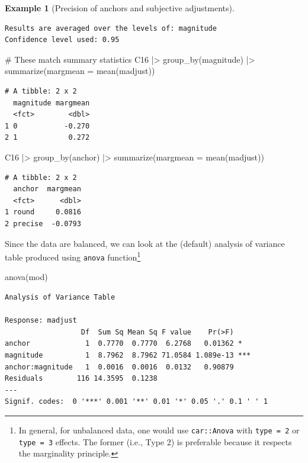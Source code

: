 \documentclass[
  11pt,
  letterpaper,
]{scrbook}
\newenvironment{Shaded}{\begin{snugshade}}{\end{snugshade}}
\newcommand{\AttributeTok}[1]{\textcolor[rgb]{0.40,0.45,0.13}{#1}}
\newcommand{\CommentTok}[1]{\textcolor[rgb]{0.37,0.37,0.37}{#1}}
\newcommand{\FunctionTok}[1]{\textcolor[rgb]{0.28,0.35,0.67}{#1}}
\newcommand{\NormalTok}[1]{\textcolor[rgb]{0.00,0.23,0.31}{#1}}
\newcommand{\SpecialCharTok}[1]{\textcolor[rgb]{0.37,0.37,0.37}{#1}}
\theoremstyle{definition}
\theoremstyle{definition}
\newtheorem{example}{Example}[chapter]
\theoremstyle{remark}
\begin{document}
\begin{example}[Precision of anchors and subjective
adjustments]
\begin{verbatim}
Results are averaged over the levels of: magnitude 
Confidence level used: 0.95 
\end{verbatim}

\begin{Shaded}
\begin{Highlighting}[]
\CommentTok{\# These match summary statistics}
\NormalTok{C16 }\SpecialCharTok{|\textgreater{}}
  \FunctionTok{group\_by}\NormalTok{(magnitude) }\SpecialCharTok{|\textgreater{}}
  \FunctionTok{summarize}\NormalTok{(}\AttributeTok{margmean =} \FunctionTok{mean}\NormalTok{(madjust))}
\end{Highlighting}
\end{Shaded}

\begin{verbatim}
# A tibble: 2 x 2
  magnitude margmean
  <fct>        <dbl>
1 0           -0.270
2 1            0.272
\end{verbatim}

\begin{Shaded}
\begin{Highlighting}[]
\NormalTok{C16 }\SpecialCharTok{|\textgreater{}}
  \FunctionTok{group\_by}\NormalTok{(anchor) }\SpecialCharTok{|\textgreater{}}
  \FunctionTok{summarize}\NormalTok{(}\AttributeTok{margmean =} \FunctionTok{mean}\NormalTok{(madjust))}
\end{Highlighting}
\end{Shaded}

\begin{verbatim}
# A tibble: 2 x 2
  anchor  margmean
  <fct>      <dbl>
1 round     0.0816
2 precise  -0.0793
\end{verbatim}

Since the data are balanced, we can look at the (default) analysis of
variance table produced using \texttt{anova} function\footnote{In
  general, for unbalanced data, one would use \texttt{car::Anova} with
  \texttt{type\ =\ 2} or \texttt{type\ =\ 3} effects. The former (i.e.,
  Type 2) is preferable because it respects the marginality principle.}

\begin{Shaded}
\begin{Highlighting}[]
\FunctionTok{anova}\NormalTok{(mod)}
\end{Highlighting}
\end{Shaded}

\begin{verbatim}
Analysis of Variance Table

Response: madjust
                  Df  Sum Sq Mean Sq F value    Pr(>F)    
anchor             1  0.7770  0.7770  6.2768   0.01362 *  
magnitude          1  8.7962  8.7962 71.0584 1.089e-13 ***
anchor:magnitude   1  0.0016  0.0016  0.0132   0.90879    
Residuals        116 14.3595  0.1238                      
---
Signif. codes:  0 '***' 0.001 '**' 0.01 '*' 0.05 '.' 0.1 ' ' 1
\end{verbatim}


\end{example}
\end{document}
